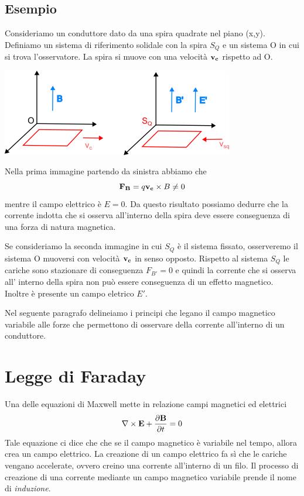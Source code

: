\subsection{Esempio}

Consideriamo un conduttore dato da una spira quadrate nel piano (x,y). Definiamo un sistema di riferimento solidale con la spira $S_Q$ e un sistema  O in cui si trova l'osservatore. La spira si muove con una velocit\`a $\bold{v_c}$ rispetto ad O. 
\begin{center}
\includegraphics[width = 0.6 \textwidth]{images/relati.png}
\end{center}

Nella prima immagine partendo da sinistra abbiamo che 
\begin{equation}
	\bold{F_B} = q\bold{v_c} \times B \neq 0  
\end{equation}
mentre il campo elettrico \`e $E = 0 $. Da questo risultato possiamo dedurre che la corrente indotta che si osserva all'interno della spira deve essere conseguenza di una forza di natura magnetica. 

Se consideriamo la seconda immagine in cui $S_Q$ \`e  il sistema fissato, osserveremo il sistema O muoversi con velocit\`a $\bold{v_c}$ in senso opposto. Rispetto al sistema  $S_Q$ le cariche sono stazionare 
di conseguenza $F_{B'} = 0$ e quindi la corrente che si osserva all' interno della spira non pu\`o essere conseguenza di un effetto magnetico. Inoltre \`e presente un campo eletrico $E'$.

Nel seguente paragrafo delineiamo i principi che legano il campo magnetico variabile alle forze che permettono di osservare della corrente all'interno di un conduttore.
\section{Legge di Faraday}

Una delle equazioni di Maxwell mette in relazione campi magnetici ed elettrici 
\begin{equation}
	\nabla \times \bold{E} + \frac{\partial \bold{B}}{\partial t} = 0
\end{equation}
Tale equazione ci dice che che se il campo magnetico \`e variabile nel tempo, allora crea un campo elettrico. La creazione di un campo elettrico fa s\`i che le cariche vengano accelerate, ovvero creino una corrente all'interno di un filo. Il processo di creazione di una corrente mediante un campo magnetico variabile prende il nome di \textit{induzione}.

